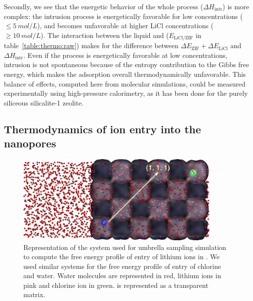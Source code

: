 \documentclass[thesis]{subfiles}
\begin{document}
Secondly, we see that the energetic behavior of the whole process ($\Delta
H_\text{intr}$) is more complex: the intrusion process is energetically
favorable for low concentrations ($\leq \SI{5}{mol/L}$), and becomes unfavorable
at higher LiCl concentrations ($\geq \SI{10}{mol/L}$). The interaction between
the liquid and  ($E_\text{LiCl/ZIF}$ in table~\ref{table:thermo:raw}) makes
for the difference between $\Delta E_\text{ZIF} + \Delta E_\text{LiCl}$ and
$\Delta H_\text{intr}$. Even if the process is energetically favorable at low
concentrations, intrusion is not spontaneous because of the entropy contribution
to the Gibbs free energy, which makes the adsorption overall thermodynamically
unfavorable. This balance of effects, computed here from molecular simulations,
could be measured experimentally using high-pressure calorimetry, as it has been
done for the purely siliceous silicalite-1 zeolite\cite{Karbowiak2009,
Karbowiak2010}.

\subsection{Thermodynamics of ion entry into the nanopores}

\begin{figure}[t]
    \centering
    \includegraphics[width=0.9\textwidth]{figures/images/licl-zif-umbrella}
    \caption{Representation of the system used for umbrella sampling simulation
    to compute the free energy profile of entry of lithium ions in . We
    used similar systems for the free energy profile of entry of chlorine and
    water. Water molecules are represented in red, lithium ions in pink and
    chlorine ion in green.  is represented as a transparent matrix.}
    \label{fig:licl-zif:umbrella-system}
\end{figure}
\end{document}
